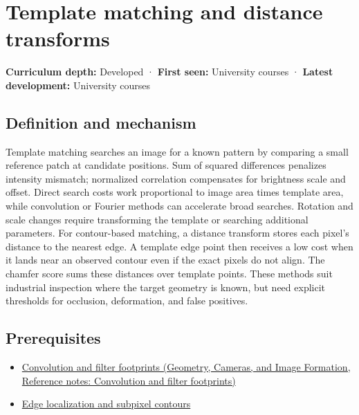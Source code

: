 \hypertarget{appendix-5fb4af80d1c7}{}\label{referencestart:appendix-5fb4af80d1c7}
\section{Template matching and distance transforms}\label{appendix-5fb4af80d1c7-template-matching-and-distance-transforms}

\textbf{Curriculum depth:} Developed · \textbf{First seen:} University courses · \textbf{Latest development:} University courses

\subsection{Definition and mechanism}\label{appendix-5fb4af80d1c7-definition-and-mechanism}

Template matching searches an image for a known pattern by comparing a small reference patch at candidate positions. Sum of squared differences penalizes intensity mismatch; normalized correlation compensates for brightness scale and offset. Direct search costs work proportional to image area times template area, while convolution or Fourier methods can accelerate broad searches. Rotation and scale changes require transforming the template or searching additional parameters. For contour-based matching, a distance transform stores each pixel's distance to the nearest edge. A template edge point then receives a low cost when it lands near an observed contour even if the exact pixels do not align. The chamfer score sums these distances over template points. These methods suit industrial inspection where the target geometry is known, but need explicit thresholds for occlusion, deformation, and false positives.

\subsection{Prerequisites}\label{appendix-5fb4af80d1c7-prerequisites}

\begin{itemize}
\tightlist
\item
  \href{../03-Geometry-Cameras-and-Image-Formation/main.pdf\#nameddest=appendix-d5b3c692d9f0}{Convolution and filter footprints (Geometry, Cameras, and Image Formation, Reference notes: Convolution and filter footprints)}
\item
  \hyperref[appendix-36022286b03e]{Edge localization and subpixel contours}
\end{itemize}

